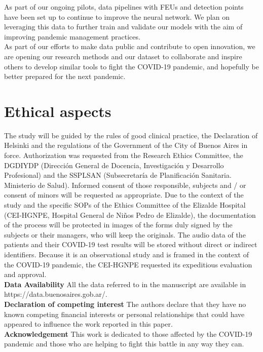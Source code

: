 \documentclass{nle}
\begin{document}
As part of our ongoing pilots, data pipelines with FEUs and detection points have been set up to continue to improve the neural network. We plan on leveraging this data to further train and validate our models with the aim of improving pandemic management practices.\\

As part of our efforts to make data public and contribute to open innovation, we are opening our research methods and our dataset to collaborate and inspire others to develop similar tools to fight the COVID-19 pandemic, and hopefully be better prepared for the next pandemic.

\section{Ethical aspects}

The study will be guided by the rules of good clinical practice, the Declaration of Helsinki and the regulations of the Government of the City of Buenos Aires in force. Authorization was requested from the Research Ethics Committee, the DGDIYDP (Dirección General de Docencia, Investigación y Desarrollo Profesional) and the SSPLSAN (Subsecretaría de Planificación Sanitaria. Ministerio de Salud). Informed consent of those responsible, subjects and / or consent of minors will be requested as appropriate. Due to the context of the study and the specific SOPs of the Ethics Committee of the Elizalde Hospital (CEI-HGNPE, Hospital General de Niños Pedro de Elizalde), the documentation of the process will be protected in images of the forms duly signed by the subjects or their managers, who will keep the originals. The audio data of the patients and their COVID-19 test results will be stored without direct or indirect identifiers. Because it is an observational study and is framed in the context of the COVID-19 pandemic, the CEI-HGNPE requested its expeditious evaluation and approval.\\


\textbf{Data Availability} All the data referred to in the manuscript are available in https://data.buenosaires.gob.ar/.\\

\textbf{Declaration of competing interest} The authors declare that they have no known competing financial interests or personal relationships that could have appeared to influence the work reported in this paper.\\

\textbf{Acknowledgement} This work is dedicated to those affected by the COVID-19 pandemic and those who are helping to fight this battle in any way they can.\\
\end{document}
